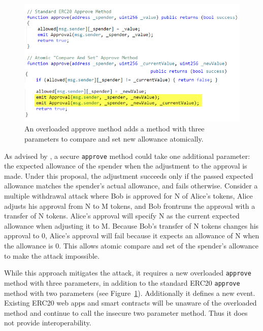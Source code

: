 \begin{figure}[t]
	\centering
	\includegraphics[width=1.0\linewidth]{figures/multiple_withdrawal_12.png}
	\caption{An overloaded approve method adds a method with three parameters to compare and set new allowance atomically.\label{fig:api}}
\end{figure}

As advised by \cite{Ref03}, a secure \texttt{approve} method could take one additional parameter: the expected allowance of the spender when the adjustment to the approval is made. Under this proposal, the adjustment succeeds only if the passed expected allowance matches the spender's actual allowance, and fails otherwise. Consider a multiple withdrawal attack where Bob is approved for N of Alice's tokens, Alice adjusts his approval from N to M tokens, and Bob frontruns the approval with a transfer of N tokens. Alice's approval will specify N as the current expected allowance when adjusting it to M. Because Bob's transfer of N tokens changes his approval to 0, Alice's approval will fail because it expects an allowance of N when the allowance is 0. This allows atomic compare and set of the spender's allowance to make the attack impossible. 

While this approach mitigates the attack, it requires a new overloaded \texttt{approve} method with three parameters, in addition to the standard ERC20 \texttt{approve} method with two parameters (see Figure~\ref{fig:api}). Additionally it defines a new event. Existing ERC20 web apps and smart contracts will be unaware of the overloaded method and continue to call the insecure two parameter method. Thus it does not provide interoperability. 


